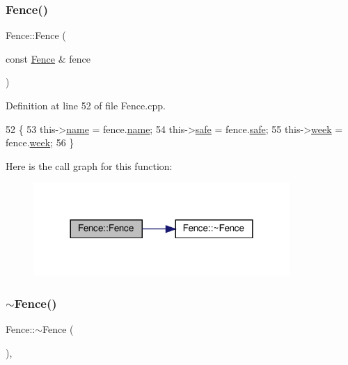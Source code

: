 \subsubsection{\texorpdfstring{Fence()}{Fence()}\hspace{0.1cm}{\footnotesize\ttfamily [3/3]}}
{\footnotesize\ttfamily Fence\+::\+Fence (\begin{DoxyParamCaption}\item[{const \hyperlink{class_fence}{Fence} \&}]{fence }\end{DoxyParamCaption})}



Definition at line 52 of file Fence.\+cpp.


\begin{DoxyCode}
52                                \{
53     this->\hyperlink{class_fence_aa405676733f25812b38ea0dd9ccd1863}{name} = fence.\hyperlink{class_fence_aa405676733f25812b38ea0dd9ccd1863}{name};
54     this->\hyperlink{class_fence_ad570430040eee657c625a67d5589c4b5}{safe} = fence.\hyperlink{class_fence_ad570430040eee657c625a67d5589c4b5}{safe};
55     this->\hyperlink{class_fence_ae589e973fa03316847aeceedd72e2b64}{week} = fence.\hyperlink{class_fence_ae589e973fa03316847aeceedd72e2b64}{week};
56 \}
\end{DoxyCode}
Here is the call graph for this function\+:
\nopagebreak
\begin{figure}[H]
\begin{center}
\leavevmode
\includegraphics[width=276pt]{d0/db8/class_fence_a3fdfc7240f1e938dab4c9534c63aa427_cgraph}
\end{center}
\end{figure}
\mbox{\label{class_fence_a6c5e019535f94462bfab1ad19b865c55}} 
\subsubsection{\texorpdfstring{$\sim$\+Fence()}{~Fence()}}
{\footnotesize\ttfamily Fence\+::$\sim$\+Fence (\begin{DoxyParamCaption}{ }\end{DoxyParamCaption})\hspace{0.3cm}{\ttfamily [pure virtual]}, {\ttfamily [default]}}

